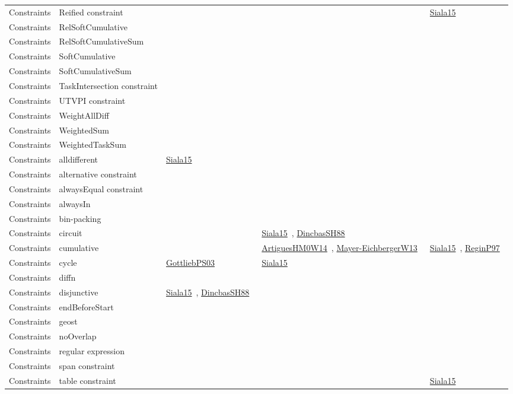 {\begin{longtable}{lp{3cm}>{\raggedright\arraybackslash}p{6cm}>{\raggedright\arraybackslash}p{6cm}>{\raggedright\arraybackslash}p{8cm}}
Constraints & Reified constraint &  &  & \href{cars/works/Siala15.pdf}{Siala15}~\cite{Siala15}\\
Constraints & RelSoftCumulative &  &  & \\
Constraints & RelSoftCumulativeSum &  &  & \\
Constraints & SoftCumulative &  &  & \\
Constraints & SoftCumulativeSum &  &  & \\
Constraints & TaskIntersection constraint &  &  & \\
Constraints & UTVPI constraint &  &  & \\
Constraints & WeightAllDiff &  &  & \\
Constraints & WeightedSum &  &  & \\
Constraints & WeightedTaskSum &  &  & \\
Constraints & alldifferent & \href{cars/works/Siala15.pdf}{Siala15}~\cite{Siala15} &  & \\
Constraints & alternative constraint &  &  & \\
Constraints & alwaysEqual constraint &  &  & \\
Constraints & alwaysIn &  &  & \\
Constraints & bin-packing &  &  & \\
Constraints & circuit &  & \href{cars/works/Siala15.pdf}{Siala15}~\cite{Siala15}, \href{cars/works/DincbasSH88.pdf}{DincbasSH88}~\cite{DincbasSH88} & \\
Constraints & cumulative &  & \href{cars/works/ArtiguesHM0W14.pdf}{ArtiguesHM0W14}~\cite{ArtiguesHM0W14}, \href{cars/works/Mayer-EichbergerW13.pdf}{Mayer-EichbergerW13}~\cite{Mayer-EichbergerW13} & \href{cars/works/Siala15.pdf}{Siala15}~\cite{Siala15}, \href{cars/works/ReginP97.pdf}{ReginP97}~\cite{ReginP97}\\
Constraints & cycle & \href{cars/works/GottliebPS03.pdf}{GottliebPS03}~\cite{GottliebPS03} & \href{cars/works/Siala15.pdf}{Siala15}~\cite{Siala15} & \\
Constraints & diffn &  &  & \\
Constraints & disjunctive & \href{cars/works/Siala15.pdf}{Siala15}~\cite{Siala15}, \href{cars/works/DincbasSH88.pdf}{DincbasSH88}~\cite{DincbasSH88} &  & \\
Constraints & endBeforeStart &  &  & \\
Constraints & geost &  &  & \\
Constraints & noOverlap &  &  & \\
Constraints & regular expression &  &  & \\
Constraints & span constraint &  &  & \\
Constraints & table constraint &  &  & \href{cars/works/Siala15.pdf}{Siala15}~\cite{Siala15}\\
\end{longtable}
}

